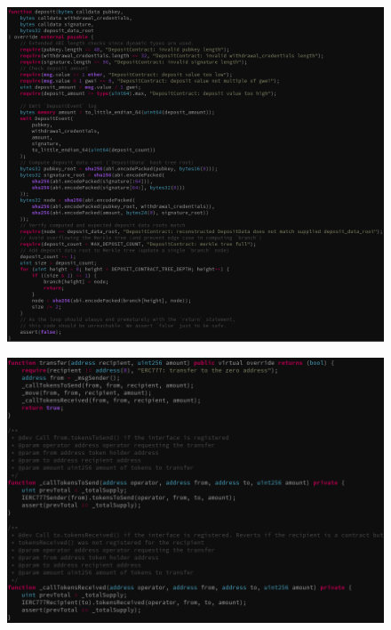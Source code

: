 \documentclass[aspectratio=169,10pt]{beamer}
\begin{document}
\begin{frame}[fragile]
\begin{center}
\begin{figure}
	\includegraphics[scale=0.25]{images/deposit_pass}
\end{figure}
\end{center}
\end{frame}

\begin{frame}[fragile]
\begin{center}
\begin{figure}
	\includegraphics[scale=0.35]{images/erc777_fail}
\end{figure}
\end{center}
\end{frame}
\end{document}
